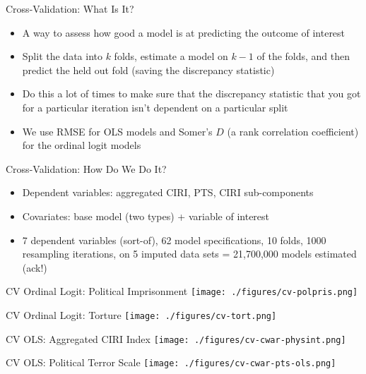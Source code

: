 \documentclass{beamer}
\begin{document}
\begin{frame}{Cross-Validation: What Is It?}
  \begin{itemize}
  \item A way to assess how good a model is at predicting the outcome of interest
  \item Split the data into $k$ folds, estimate a model on $k-1$ of the folds, and then predict the held out fold (saving the discrepancy statistic)
  \item Do this a lot of times to make sure that the discrepancy statistic that you got for a particular iteration isn't dependent on a particular split
  \item We use RMSE for OLS models and Somer's $D$ (a rank correlation coefficient) for the ordinal logit models
  \end{itemize}
\end{frame}

\begin{frame}{Cross-Validation: How Do We Do It?}
  \begin{itemize}
  \item Dependent variables: aggregated CIRI, PTS, CIRI sub-components
  \item Covariates: base model (two types) + variable of interest
  \item 7 dependent variables (sort-of), 62 model specifications, 10 folds, 1000 resampling iterations, on 5 imputed data sets = 21,700,000 models estimated (ack!)
  \end{itemize}
\end{frame}

\begin{frame}{CV Ordinal Logit: Political Imprisonment}
  \centering
  \texttt{[image: ./figures/cv-polpris.png]}
\end{frame}

\begin{frame}{CV Ordinal Logit: Torture}
  \centering
  \texttt{[image: ./figures/cv-tort.png]}
\end{frame}

\begin{frame}{CV OLS: Aggregated CIRI Index}
  \centering
  \texttt{[image: ./figures/cv-cwar-physint.png]}
\end{frame}

\begin{frame}{CV OLS: Political Terror Scale}
  \centering
  \texttt{[image: ./figures/cv-cwar-pts-ols.png]}
\end{frame}
\end{document}
